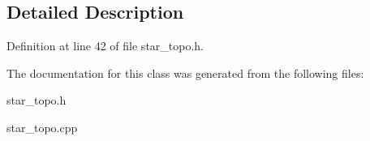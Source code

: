 \subsection{Detailed Description}




Definition at line 42 of file star\_\-topo.h.

The documentation for this class was generated from the following files:\begin{CompactItemize}
\item 
star\_\-topo.h\item 
star\_\-topo.cpp\end{CompactItemize}
